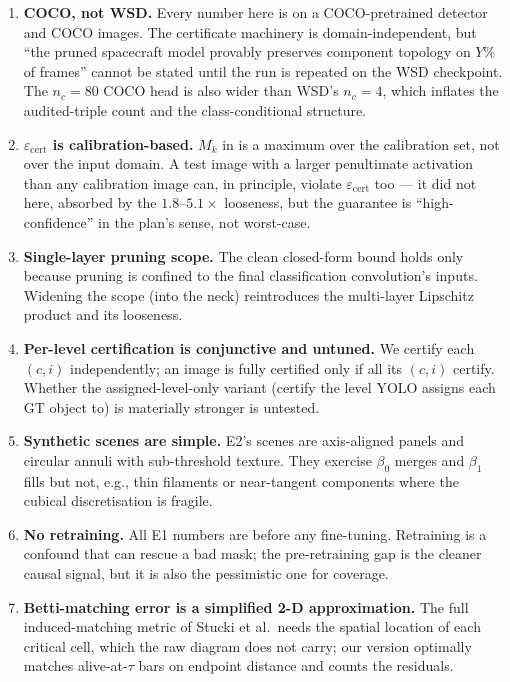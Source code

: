 \documentclass[11pt]{article}
\newcommand{\epscert}{\varepsilon_{\mathrm{cert}}}
\newcommand{\Betti}{\beta}
\theoremstyle{definition}
\theoremstyle{plain}
\begin{document}
\begin{enumerate}[leftmargin=1.5em]
\item \textbf{COCO, not WSD.} Every number here is on a COCO-pretrained detector
and COCO images. The certificate machinery is domain-independent, but ``the
pruned spacecraft model provably preserves component topology on $Y\%$ of
frames'' cannot be stated until the run is repeated on the WSD checkpoint. The
$n_c = 80$ COCO head is also wider than WSD's $n_c = 4$, which inflates the
audited-triple count and the class-conditional structure.
\item \textbf{$\epscert$ is calibration-based.} $M_k$ in  is a
maximum over the calibration set, not over the input domain. A test image with a
larger penultimate activation than any calibration image can, in principle,
violate $\epscert$ too --- it did not here, absorbed by the
$1.8$--$5.1\times$ looseness, but the guarantee is ``high-confidence'' in the
plan's sense, not worst-case.
\item \textbf{Single-layer pruning scope.} The clean closed-form bound holds only
because pruning is confined to the final classification convolution's inputs.
Widening the scope (into the neck) reintroduces the multi-layer Lipschitz product
and its looseness.
\item \textbf{Per-level certification is conjunctive and untuned.} We certify
each $(c,i)$ independently; an image is fully certified only if all its
$(c,i)$ certify. Whether the assigned-level-only variant (certify the level YOLO
assigns each GT object to) is materially stronger is untested.
\item \textbf{Synthetic scenes are simple.} E2's scenes are axis-aligned panels
and circular annuli with sub-threshold texture. They exercise $\Betti_0$ merges
and $\Betti_1$ fills but not, e.g., thin filaments or near-tangent components
where the cubical discretisation is fragile.
\item \textbf{No retraining.} All E1 numbers are before any fine-tuning. Retraining
is a confound that can rescue a bad mask; the pre-retraining gap is the cleaner
causal signal, but it is also the pessimistic one for coverage.
\item \textbf{Betti-matching error is a simplified 2-D approximation.} The full
induced-matching metric of Stucki et al.\ needs the spatial location of each
critical cell, which the raw diagram does not carry; our version optimally
matches alive-at-$\tau$ bars on endpoint distance and counts the residuals.
\end{enumerate}
\end{document}
